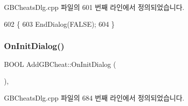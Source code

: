 G\+B\+Cheats\+Dlg.\+cpp 파일의 601 번째 라인에서 정의되었습니다.


\begin{DoxyCode}
602 \{
603   EndDialog(FALSE);
604 \}
\end{DoxyCode}
\mbox{\label{class_add_g_b_cheat_a97210ad566b117af4994adac5d954e94}} 
\subsubsection{\texorpdfstring{On\+Init\+Dialog()}{OnInitDialog()}}
{\footnotesize\ttfamily B\+O\+OL Add\+G\+B\+Cheat\+::\+On\+Init\+Dialog (\begin{DoxyParamCaption}{ }\end{DoxyParamCaption})\hspace{0.3cm}{\ttfamily [protected]}, {\ttfamily [virtual]}}



G\+B\+Cheats\+Dlg.\+cpp 파일의 684 번째 라인에서 정의되었습니다.


